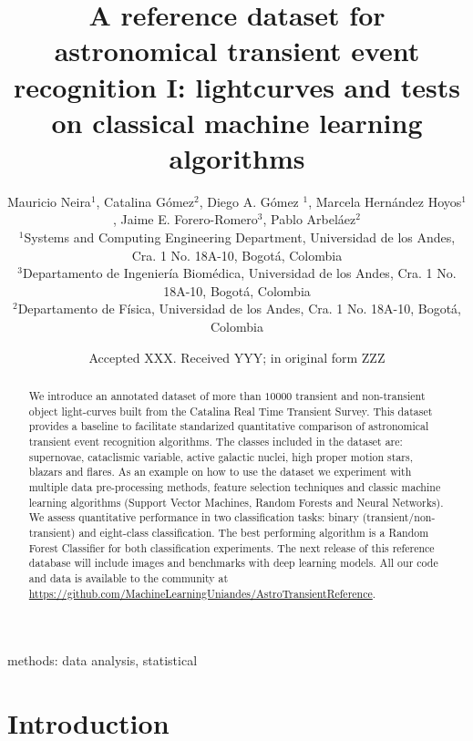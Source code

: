 \documentclass[a4paper,fleqn,usenatbib]{mnras}
\title[A reference transient dataset I: lightcurves]{A reference
  dataset for astronomical transient event recognition I: lightcurves
  and tests on classical machine learning algorithms}
\author[M. Neira et al.]
{Mauricio Neira$^{1}$, Catalina G\'omez$^{2}$, Diego A. G\'omez $^{1}$,
Marcela Hern\'andez Hoyos$^{1}$,   
\newauthor
Jaime E. Forero-Romero$^{3}$,
Pablo Arbel\'aez$^{2}$
\\
$^{1}$Systems and Computing Engineering Department, Universidad de los Andes, Cra. 1 No. 18A-10, Bogot\'a, Colombia\\
$^{3}$Departamento de Ingenier\'ia Biom\'edica, Universidad de los Andes, Cra. 1 No. 18A-10, Bogot\'a, Colombia\\
$^{2}$Departamento de F\'isica, Universidad de los Andes, Cra. 1 No. 18A-10, Bogot\'a, Colombia
}
\date{Accepted XXX. Received YYY; in original form ZZZ}
\begin{document}
\label{firstpage}
\pagerange{\pageref{firstpage}--\pageref{lastpage}}
\maketitle

\begin{abstract}

We introduce an annotated dataset of more than $10000$ transient and non-transient
object light-curves built from the Catalina Real Time Transient Survey.
This dataset provides a baseline to facilitate standarized
quantitative comparison of astronomical transient event recognition
algorithms.    
The classes included in the dataset are: supernovae, cataclismic
variable, active galactic nuclei, high proper motion stars, blazars
and flares.
As an example on how to use the dataset we experiment with multiple
data pre-processing methods, feature selection techniques and classic
machine learning algorithms (Support Vector Machines, Random Forests
and Neural Networks).   
We assess quantitative performance in two classification tasks:
binary (transient/non-transient) and eight-class classification.   
The best performing algorithm is a Random Forest Classifier for both
classification experiments.  
The next release of this reference database will include images and
benchmarks with deep learning models.
All our code and data is available to the community at
\url{https://github.com/MachineLearningUniandes/AstroTransientReference}.
\end{abstract}

\begin{keywords}
methods: data analysis, statistical
\end{keywords}



\section{Introduction}
\end{document}
